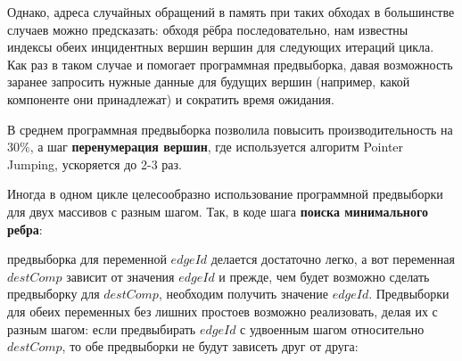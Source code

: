 \documentclass[a4paper,10pt]{extarticle}
\begin{document}
Однако, адреса случайных обращений в память при таких обходах в большинстве случаев можно предсказать: обходя рёбра последовательно, нам известны индексы обеих инцидентных вершин вершин для следующих итераций цикла.
Как раз в таком случае и помогает программная предвыборка, давая возможность заранее запросить нужные данные для будущих вершин (например, какой компоненте они принадлежат) и сократить время ожидания.


В среднем программная предвыборка позволила повысить производительность на 30\%, а шаг \textbf{перенумерация вершин}, где используется алгоритм Pointer Jumping, ускоряется до 2-3 раз. %

Иногда в одном цикле целесообразно использование программной предвыборки для двух массивов с разным шагом. Так, в коде шага \textbf{поиска минимального ребра}:

\begin{algorithm}[H]
    \SetAlgoLined
\end{algorithm}
предвыборка для переменной $edgeId$ делается достаточно легко, а вот переменная $destComp$ зависит от значения $edgeId$ и прежде, чем будет возможно сделать предвыборку для $destComp$, необходим получить значение $edgeId$.
Предвыборки для обеих переменных без лишних простоев возможно реализовать, делая их с разным шагом: если предвыбирать $edgeId$ с удвоенным шагом относительно $destComp$, то обе предвыборки не будут зависеть друг от друга:


\end{document}
